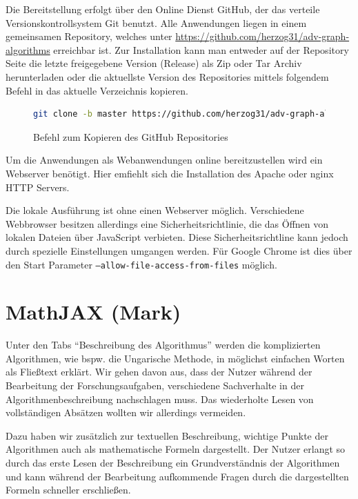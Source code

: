 Die Bereitstellung erfolgt über den Online Dienst GitHub, der das verteile Versionskontrollsystem Git benutzt. 
Alle Anwendungen liegen in einem gemeinsamen Repository, welches unter \url{https://github.com/herzog31/adv-graph-algorithms} erreichbar ist. Zur Installation kann man entweder auf der Repository Seite die letzte freigegebene Version (Release) als Zip oder Tar Archiv herunterladen oder die aktuellste Version des Repositories mittels folgendem Befehl in das aktuelle Verzeichnis kopieren.

\begin{figure}[h!]
\begin{lstlisting}[language=Bash]
git clone -b master https://github.com/herzog31/adv-graph-algorithms.git
\end{lstlisting}
\caption[Repository Kopieren]{Befehl zum Kopieren des GitHub Repositories}\label{fig:listing-github}
\end{figure}

Um die Anwendungen als Webanwendungen online bereitzustellen wird ein Webserver benötigt. Hier emfiehlt sich die Installation des Apache oder nginx  HTTP Servers.

Die lokale Ausführung ist ohne einen Webserver möglich. Verschiedene Webbrowser besitzen allerdings eine Sicherheitsrichtlinie, die das Öffnen von lokalen Dateien über JavaScript verbieten. Diese Sicherheitsrichtline kann jedoch durch spezielle Einstellungen umgangen werden. Für Google Chrome ist dies über den Start Parameter \texttt{--allow-file-access-from-files} möglich.

\section{MathJAX (Mark)}
Unter den Tabs \enquote{Beschreibung des Algorithmus} werden die komplizierten Algorithmen, wie bspw. die Ungarische Methode, in möglichst einfachen Worten als Fließtext erklärt. Wir gehen davon aus, dass der Nutzer während der Bearbeitung der Forschungsaufgaben, verschiedene Sachverhalte in der Algorithmenbeschreibung nachschlagen muss. Das wiederholte Lesen von vollständigen Absätzen wollten wir allerdings vermeiden.

Dazu haben wir zusätzlich zur textuellen Beschreibung, wichtige Punkte der Algorithmen auch als mathematische Formeln dargestellt. Der Nutzer erlangt so durch das erste Lesen der Beschreibung ein Grundverständnis der Algorithmen und kann während der Bearbeitung aufkommende Fragen durch die dargestellten Formeln schneller erschließen.

